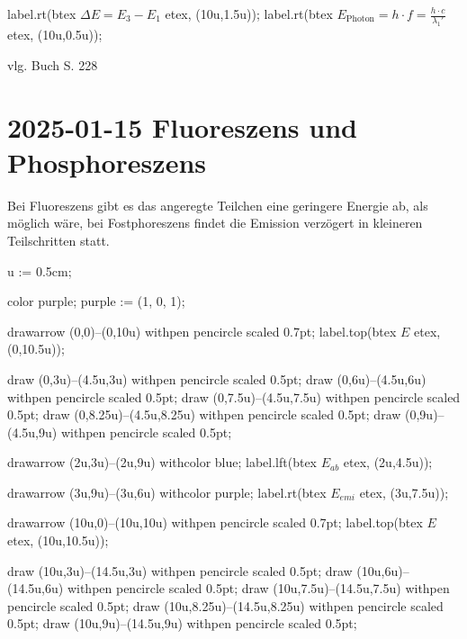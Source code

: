 label.rt(btex $\Delta E = E_3 - E_1$ etex, (10u,1.5u));
label.rt(btex $E_{\text{Photon}} = h \cdot f = \frac{h \cdot c}{\lambda_1'}$ etex, (10u,0.5u));

\stopMPpage
\stopbuffer


\startframedtask
vlg. Buch S. 228
\stopframedtask

\section{2025-01-15 Fluoreszens und Phosphoreszens}

\startframedtipp
Bei Fluoreszens gibt es das angeregte Teilchen eine geringere Energie ab, als möglich wäre, bei Fostphoreszens findet die Emission verzögert in kleineren Teilschritten statt.
\stopframedtipp


\startMPpage
u := 0.5cm;

color purple;
purple := (1, 0, 1); %

drawarrow (0,0)--(0,10u) withpen pencircle scaled 0.7pt;
label.top(btex $E$ etex, (0,10.5u));

draw (0,3u)--(4.5u,3u) withpen pencircle scaled 0.5pt;
draw (0,6u)--(4.5u,6u) withpen pencircle scaled 0.5pt;
draw (0,7.5u)--(4.5u,7.5u) withpen pencircle scaled 0.5pt;
draw (0,8.25u)--(4.5u,8.25u) withpen pencircle scaled 0.5pt;
draw (0,9u)--(4.5u,9u) withpen pencircle scaled 0.5pt;


drawarrow (2u,3u)--(2u,9u) withcolor blue;
label.lft(btex $E_{ab}$ etex, (2u,4.5u));

drawarrow (3u,9u)--(3u,6u) withcolor purple;
label.rt(btex $E_{emi}$ etex, (3u,7.5u));


drawarrow (10u,0)--(10u,10u) withpen pencircle scaled 0.7pt;
label.top(btex $E$ etex, (10u,10.5u));

draw (10u,3u)--(14.5u,3u) withpen pencircle scaled 0.5pt;
draw (10u,6u)--(14.5u,6u) withpen pencircle scaled 0.5pt;
draw (10u,7.5u)--(14.5u,7.5u) withpen pencircle scaled 0.5pt;
draw (10u,8.25u)--(14.5u,8.25u) withpen pencircle scaled 0.5pt;
draw (10u,9u)--(14.5u,9u) withpen pencircle scaled 0.5pt;

